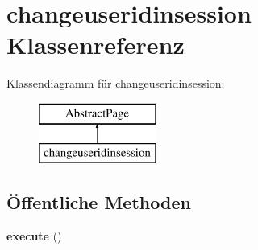 \hypertarget{classchangeuseridinsession}{}\section{changeuseridinsession Klassenreferenz}
\label{classchangeuseridinsession}
Klassendiagramm für changeuseridinsession\+:\begin{figure}[H]
\begin{center}
\leavevmode
\includegraphics[height=2.000000cm]{classchangeuseridinsession}
\end{center}
\end{figure}
\subsection*{Öffentliche Methoden}
\begin{DoxyCompactItemize}
\item 
\mbox{\label{classchangeuseridinsession_a77900279c57b160b1f5aa341497fc595}} 
{\bfseries execute} ()
\end{DoxyCompactItemize}
